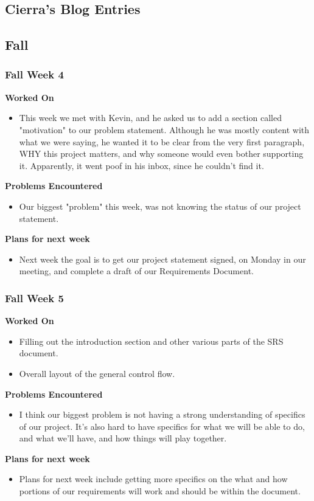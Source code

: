 \documentclass[compsoc,draftclsnofoot,onecolumn,10pt]{IEEEtran}
\begin{document}
\subsection{Cierra's Blog Entries}
    
\subsection{Fall}
\subsubsection*{Fall Week 4}
\textbf{Worked On}
\begin{itemize}
    \item This week we met with Kevin, and he asked us to add a section called "motivation" to our problem statement. Although he was mostly content with what we were saying, he wanted it to be clear from the very first paragraph, WHY this project matters, and why someone would even bother supporting it. Apparently, it went poof in his inbox, since he couldn't find it.
\end{itemize}
\textbf{Problems Encountered}
\begin{itemize}
    \item Our biggest "problem" this week, was not knowing the status of our project statement.
\end{itemize}
\textbf{Plans for next week}
\begin{itemize}
    \item Next week the goal is to get our project statement signed, on Monday in our meeting, and complete a draft of our Requirements Document.
\end{itemize}


\subsubsection*{Fall Week 5}
\textbf{Worked On}
\begin{itemize}
    \item Filling out the introduction section and other various parts of the SRS document.
    \item Overall layout of the general control flow.
\end{itemize}
\textbf{Problems Encountered}
\begin{itemize}
    \item I think our biggest problem is not having a strong understanding of specifics of our project. It's also hard to have specifics for what we will be able to do, and what we'll have, and how things will play together.
\end{itemize}
\textbf{Plans for next week}
\begin{itemize}
    \item Plans for next week include getting more specifics on the what and how portions of our requirements will work and should be within the document.
\end{itemize}
\end{document}
